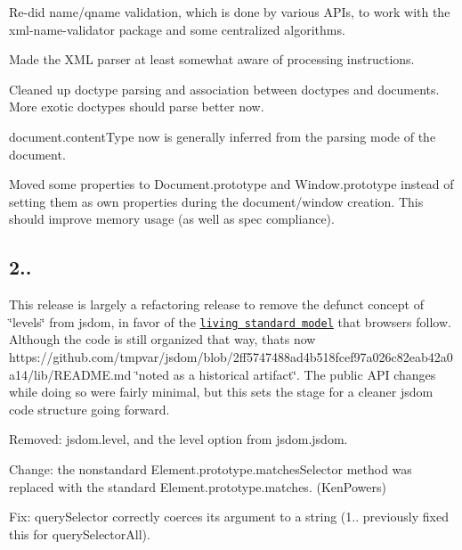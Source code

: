 \begin{DoxyItemize}
\item Re-\/did name/qname validation, which is done by various A\+P\+Is, to work with the xml-\/name-\/validator package and some centralized algorithms.
\item Made the X\+ML parser at least somewhat aware of processing instructions.
\item Cleaned up doctype parsing and association between doctypes and documents. More exotic doctypes should parse better now.
\item {\ttfamily document.\+content\+Type} now is generally inferred from the parsing mode of the document.
\item Moved some properties to {\ttfamily Document.\+prototype} and {\ttfamily Window.\+prototype} instead of setting them as own properties during the document/window creation. This should improve memory usage (as well as spec compliance).
\end{DoxyItemize}

\subsection*{2..}

This release is largely a refactoring release to remove the defunct concept of \char`\"{}levels\char`\"{} from jsdom, in favor of the \href{https://wiki.whatwg.org/wiki/FAQ#What_does_.22Living_Standard.22_mean.3F}{\tt living standard model} that browsers follow. Although the code is still organized that way, that\textquotesingle{}s now https\+://github.com/tmpvar/jsdom/blob/2ff5747488ad4b518fcef97a026c82eab42a0a14/lib/\+R\+E\+A\+D\+M\+E.\+md \char`\"{}noted as a historical artifact\char`\"{}. The public A\+PI changes while doing so were fairly minimal, but this sets the stage for a cleaner jsdom code structure going forward.


\begin{DoxyItemize}
\item Removed\+: {\ttfamily jsdom.\+level}, and the {\ttfamily level} option from {\ttfamily jsdom.\+jsdom}.
\item Change\+: the nonstandard {\ttfamily Element.\+prototype.\+matches\+Selector} method was replaced with the standard {\ttfamily Element.\+prototype.\+matches}. (Ken\+Powers)
\item Fix\+: {\ttfamily query\+Selector} correctly coerces its argument to a string (1.. previously fixed this for {\ttfamily query\+Selector\+All}).
\end{DoxyItemize}

